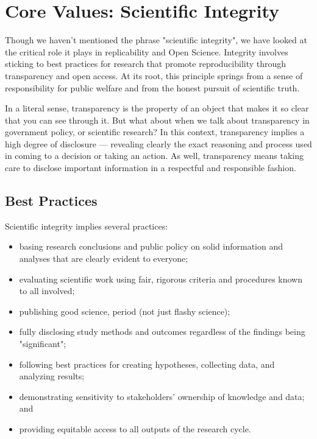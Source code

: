 \documentclass[
]{book}
\providecommand{\tightlist}{%
  \setlength{\itemsep}{0pt}\setlength{\parskip}{0pt}}
\begin{document}
\hypertarget{core-values-scientific-integrity}{%
\section{Core Values: Scientific Integrity}\label{core-values-scientific-integrity}}

Though we haven't mentioned the phrase "scientific integrity", we have looked at the critical role it plays in replicability and Open Science. Integrity involves sticking to best practices for research that promote reproducibility through transparency and open access. At its root, this principle springs from a sense of responsibility for public welfare and from the honest pursuit of scientific truth.

In a literal sense, transparency is the property of an object that makes it so clear that you can see through it. But what about when we talk about transparency in government policy, or scientific research? In this context, transparency implies a high degree of disclosure --- revealing clearly the exact reasoning and process used in coming to a decision or taking an action. As well, transparency means taking care to disclose important information in a respectful and responsible fashion.

\hypertarget{best-practices}{%
\subsection*{Best Practices}\label{best-practices}}

Scientific integrity implies several practices:

\begin{itemize}
\tightlist
\item
  basing research conclusions and public policy on solid information and analyses that are clearly evident to everyone;
\item
  evaluating scientific work using fair, rigorous criteria and procedures known to all involved;
\item
  publishing good science, period (not just flashy science);
\item
  fully disclosing study methods and outcomes regardless of the findings being "significant";
\item
  following best practices for creating hypotheses, collecting data, and analyzing results;
\item
  demonstrating sensitivity to stakeholders' ownership of knowledge and data; and
\item
  providing equitable access to all outputs of the research cycle.
\end{itemize}
\end{document}
